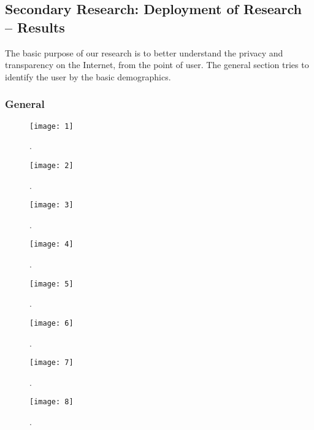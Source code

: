 \vspace{1cm}
\subsection{Secondary Research: Deployment of Research -- Results}
\vspace{0.7cm}

The basic purpose of our research is to better understand  the privacy and 
transparency on the Internet, from the point of  user.
The general section tries to identify the user by the basic demographics.

\subsubsection{General}

\begin{figure}[H]
\centering
\texttt{[image: 1]}
\caption{.}
\end{figure}

\begin{figure}[H]
\centering
\texttt{[image: 2]}
\caption{.}
\end{figure}

\begin{figure}[H]
\centering
\texttt{[image: 3]}
\caption{.}
\end{figure}

\begin{figure}[H]
\centering
\texttt{[image: 4]}
\caption{.}
\end{figure}

\begin{figure}[H]
\centering
\texttt{[image: 5]}
\caption{.}
\end{figure}

\begin{figure}[H]
\centering
\texttt{[image: 6]}
\caption{.}
\end{figure}

\begin{figure}[H]
\centering
\texttt{[image: 7]}
\caption{.}
\end{figure}

\begin{figure}[H]
\centering
\texttt{[image: 8]}
\caption{.}
\end{figure}

